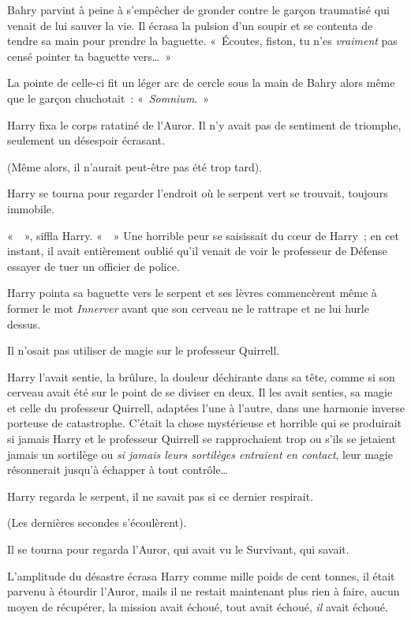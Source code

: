 Bahry parvint à peine à s'empêcher de gronder contre le garçon traumatisé qui venait de lui sauver la vie. Il écrasa la pulsion d'un soupir et se contenta de tendre sa main pour prendre la baguette. «~Écoutes, fiston, tu n'es \emph{vraiment} pas censé pointer ta baguette vers…~»

La pointe de celle-ci fit un léger arc de cercle sous la main de Bahry alors même que le garçon chuchotait~: «~\emph{Somnium}.~»

\later

Harry fixa le corps ratatiné de l'Auror. Il n'y avait pas de sentiment de triomphe, seulement un désespoir écrasant.

(Même alors, il n'aurait peut-être pas été trop tard).

Harry se tourna pour regarder l'endroit où le serpent vert se trouvait, toujours immobile.

«~~», siffla Harry. «~~» Une horrible peur se saisissait du cœur de Harry~; en cet instant, il avait entièrement oublié qu'il venait de voir le professeur de Défense essayer de tuer un officier de police.

Harry pointa sa baguette vers le serpent et ses lèvres commencèrent même à former le mot \emph{Innerver} avant que son cerveau ne le rattrape et ne lui hurle dessus.

Il n'osait pas utiliser de magie sur le professeur Quirrell.

Harry l'avait sentie, la brûlure, la douleur déchirante dans sa tête, comme si son cerveau avait été sur le point de se diviser en deux. Il les avait senties, sa magie et celle du professeur Quirrell, adaptées l'une à l'autre, dans une harmonie inverse porteuse de catastrophe. C'était la chose mystérieuse et horrible qui se produirait si jamais Harry et le professeur Quirrell se rapprochaient trop ou s'ils se jetaient jamais un sortilège ou \emph{si jamais leurs sortilèges entraient en contact}, leur magie résonnerait jusqu'à échapper à tout contrôle…

Harry regarda le serpent, il ne savait pas si ce dernier respirait.

(Les dernières secondes s'écoulèrent).

Il se tourna pour regarda l'Auror, qui avait vu le Survivant, qui savait.

L'amplitude du désastre écrasa Harry comme mille poids de cent tonnes, il était parvenu à étourdir l'Auror, mails il ne restait maintenant plus rien à faire, aucun moyen de récupérer, la mission avait échoué, tout avait échoué, \emph{il} avait échoué.

